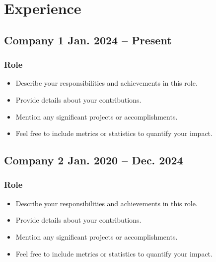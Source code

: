 \section{Experience}

\subsection{Company 1 \hfill Jan. 2024 -- Present}
\subsubsection{Role}
\begin{itemize}
    \item Describe your responsibilities and achievements in this role.
    \item Provide details about your contributions.
    \item Mention any significant projects or accomplishments.
    \item Feel free to include metrics or statistics to quantify your impact.
\end{itemize}

\subsection{Company 2 \hfill Jan. 2020 – Dec. 2024}
\subsubsection{Role}
\begin{itemize}
    \item Describe your responsibilities and achievements in this role.
    \item Provide details about your contributions.
    \item Mention any significant projects or accomplishments.
    \item Feel free to include metrics or statistics to quantify your impact.
\end{itemize}
